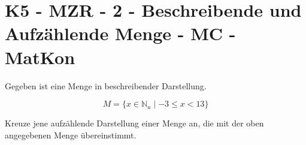 \section{K5 - MZR - 2 - Beschreibende und Aufzählende Menge - MC - MatKon}

\begin{beispiel}[K5 - MZR]{1}
Gegeben ist eine Menge in beschreibender Darstellung.

$$M=\{x\in\mathbb{N}_u\mid -3\leq x<13\}$$

Kreuze jene aufzählende Darstellung einer Menge an, die mit der oben angegebenen Menge übereinstimmt.\vspace{0,2cm}

\end{beispiel}